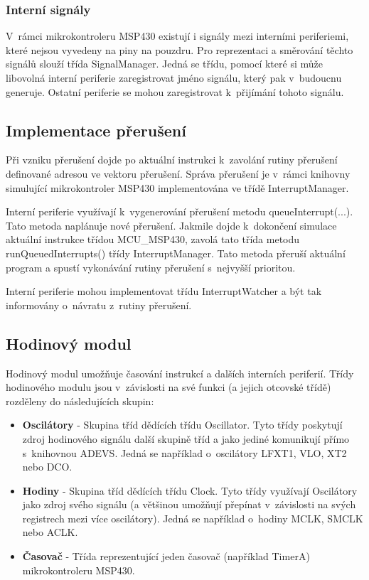 \subsubsection{Interní signály}

V~rámci mikrokontroleru MSP430 existují i signály mezi interními periferiemi, které nejsou vyvedeny na piny na pouzdru. Pro reprezentaci a směrování těchto signálů slouží třída SignalManager. Jedná se třídu, pomocí které si může libovolná interní periferie zaregistrovat jméno signálu, který pak v~budoucnu generuje. Ostatní periferie se mohou zaregistrovat k~přijímání tohoto signálu.

\subsection{Implementace přerušení}

Při vzniku přerušení dojde po aktuální instrukci k~zavolání rutiny přerušení definované adresou ve vektoru přerušení. Správa přerušení je v~rámci knihovny simulující mikrokontroler MSP430 implementována ve třídě InterruptManager.

Interní periferie využívají k~vygenerování přerušení metodu queueInterrupt(...). Tato metoda naplánuje nové přerušení. Jakmile dojde k~dokončení simulace aktuální instrukce třídou MCU\_MSP430, zavolá tato třída metodu runQueuedInterrupts() třídy InterruptManager. Tato metoda přeruší aktuální program a spustí vykonávání rutiny přerušení s~nejvyšší prioritou.

Interní periferie mohou implementovat třídu InterruptWatcher a být tak informovány o~návratu z~rutiny přerušení.

\subsection{Hodinový modul}

Hodinový modul umožňuje časování instrukcí a dalších interních periferií. Třídy hodinového modulu jsou v~závislosti na své funkci (a jejich otcovské třídě) rozděleny do následujících skupin:

\begin{itemize}
\item \textbf{Oscilátory} - Skupina tříd dědících třídu Oscillator. Tyto třídy poskytují zdroj hodinového signálu další skupině tříd a jako jediné komunikují přímo s~knihovnou ADEVS. Jedná se například o~oscilátory LFXT1, VLO, XT2 nebo DCO.
\item \textbf{Hodiny} - Skupina tříd dědících třídu Clock. Tyto třídy využívají Oscilátory jako zdroj svého signálu (a většinou umožňují přepínat v~závislosti na svých registrech mezi více oscilátory). Jedná se například o~hodiny MCLK, SMCLK nebo ACLK.
\item \textbf{Časovač} - Třída reprezentující jeden časovač (například TimerA)  mikrokontroleru MSP430.
\end{itemize}

